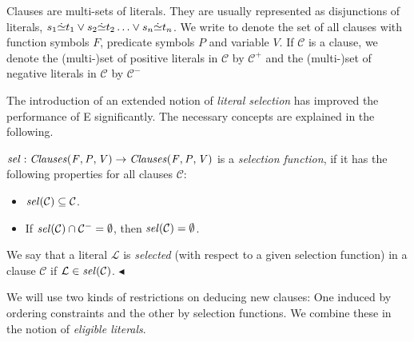 \documentclass{article}
\begin{document}
Clauses are multi-sets of literals. They are usually represented as
disjunctions of literals, $s_1\dot{\simeq}t_1 \vee s_2\dot{\simeq}t_2 \ldots
\vee s_n\dot{\simeq}t_n$. We write  to denote the set
of all clauses with function symbols $F$, predicate symbols $P$ and
variable $V$. If $\mathcal{C}$ is a clause, we denote the (multi-)set
of positive literals in $\mathcal{C}$ by $\mathcal{C^+}$ and the
(multi-)set of negative literals in $\mathcal{C}$ by $\mathcal{C^-}$

The introduction of an extended notion of \emph{literal selection} has
improved the performance of E significantly. The necessary concepts
are explained in the following.

\begin{definition}
  \label{def:basics:inferences:selection}
  $\mathit{sel}:\mathit{Clauses(F,P,V)} \rightarrow \mathit{Clauses(F,P,V)}$ is a
  \emph{selection function}, if it has the following properties for
  all clauses $\mathcal{C}$:
    \begin{itemize}
    \item $\mathit{sel}(\mathcal{C}) \subseteq \mathcal{C}$.
    \item If $\mathit{sel}(\mathcal{C})\cap \mathcal{C^-} = \emptyset$, then
      $\mathit{sel}(\mathcal{C}) = \emptyset$.
    \end{itemize}
    We say that a literal $\mathcal{L}$ is \emph{selected} (with
    respect to a given selection function) in a clause $\mathcal{C}$
    if $\mathcal{L} \in \mathit{sel}(\mathcal{C})$.
  \hfill$\blacktriangleleft$
\end{definition}

We will use two kinds of restrictions on deducing new clauses: One
induced by ordering constraints and the other by selection functions.
We combine these in the notion of \emph{eligible literals}.
\end{document}
